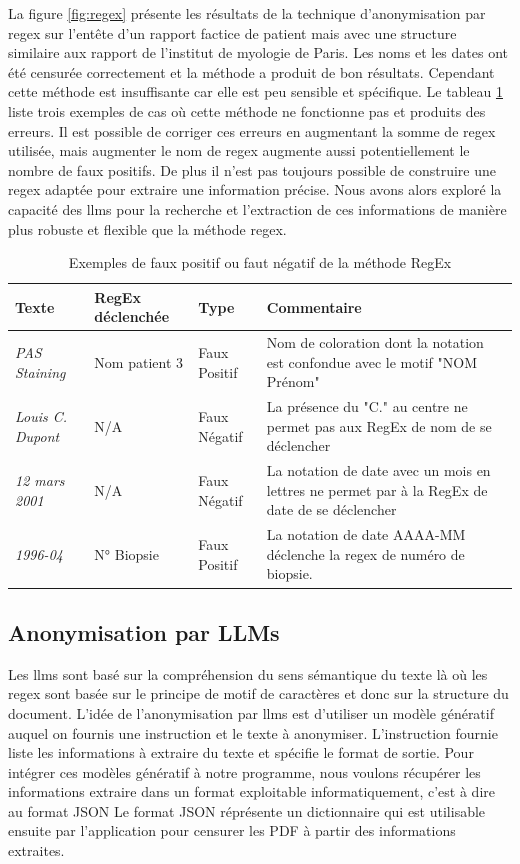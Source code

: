 La figure \ref{fig:regex}  présente les résultats de la technique d'anonymisation par \gls{regex} sur l'entête d'un rapport factice de patient mais avec une structure similaire aux rapport de l'institut de myologie de Paris. Les noms et les dates ont été censurée correctement et la méthode a produit de bon résultats. Cependant cette méthode est insuffisante car elle est peu sensible et spécifique. Le tableau \ref{tab:regex_fail} liste trois exemples de cas où cette méthode ne fonctionne pas et produits des erreurs. Il est possible de corriger ces erreurs en augmentant la somme de \gls{regex} utilisée, mais augmenter le nom de \gls{regex} augmente aussi potentiellement le nombre de faux positifs. De plus il n'est pas toujours possible de construire une \gls{regex} adaptée pour extraire une information précise. Nous avons alors exploré la capacité des \gls{llms} pour la recherche et l'extraction de ces informations de manière plus robuste et flexible que la méthode \gls{regex}.
\begin{table}[ht]
\centering
\caption{Exemples de faux positif ou faut négatif de la méthode RegEx}
\label{tab:regex_fail}
\begin{tabularx}{\textwidth}{|X|X|X|X|}
\hline
\textbf{Texte} & \textbf{RegEx déclenchée} & \textbf{Type} & \textbf{Commentaire} \\ \hline
\textit{PAS Staining} & Nom patient 3 & Faux Positif & Nom de coloration dont la notation est confondue avec le motif "NOM Prénom" \\ \hline
\textit{Louis C. Dupont} & N/A & Faux Négatif & La présence du "C." au centre ne permet pas aux RegEx de nom de se déclencher \\ \hline
\textit{12 mars 2001} & N/A & Faux Négatif & La notation de date avec un mois en lettres ne permet par à la RegEx de date de se déclencher \\ \hline
\textit{1996-04} & N° Biopsie & Faux Positif & La notation de date AAAA-MM déclenche la \gls{regex} de numéro de biopsie. \\ \hline
\end{tabularx}
\end{table}

\subsection{Anonymisation par LLMs}
Les \gls{llms} sont basé sur la compréhension du sens sémantique du texte là où les \gls{regex} sont basée sur le principe de motif de caractères et donc sur la structure du document. L'idée de l'anonymisation par \gls{llms} est d'utiliser un modèle génératif auquel on fournis une instruction et le texte à anonymiser. L'instruction fournie liste les informations à extraire du texte et spécifie le format de sortie. Pour intégrer ces modèles génératif à notre programme, nous voulons récupérer les informations extraire dans un format exploitable informatiquement, c'est à dire au format JSON Le format JSON réprésente un dictionnaire qui est utilisable ensuite par l'application pour censurer les PDF à partir des informations extraites.
